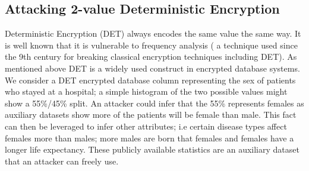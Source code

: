 \documentclass[journal]{IEEEtran}
\begin{document}
\subsection{Attacking 2-value Deterministic Encryption}
Deterministic Encryption (DET) always encodes the same value the same way. It is well known that it is vulnerable to frequency analysis ( a technique used since the 9th century\cite{Arab} for breaking classical encryption techniques including DET). As mentioned above DET is a widely used construct in encrypted database systems. We consider a DET encrypted database column representing the sex of patients who stayed at a hospital; a simple histogram of the two possible values might show a 55\%/45\% split. An attacker could infer that the 55\% represents females as auxiliary datasets show more of the patients will be female\cite{InfrenceAttacks} than male. This fact can then be leveraged to infer other attributes; i.e certain disease types affect females more than males; more males are born that females and females have a longer life expectancy. These publicly available statistics are an auxiliary dataset that an attacker can freely use. 
\end{document}
